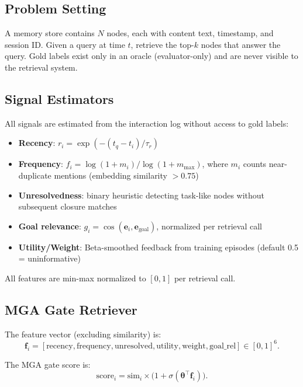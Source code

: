\documentclass[11pt,a4paper]{article}
\begin{document}
\subsection{Problem Setting}

A memory store contains $N$ nodes, each with content text, timestamp, and session ID. Given a query at time $t$, retrieve the top-$k$ nodes that answer the query. Gold labels exist only in an oracle (evaluator-only) and are never visible to the retrieval system.

\subsection{Signal Estimators}

All signals are estimated from the interaction log without access to gold labels:

\begin{itemize}[leftmargin=2em]
\item \textbf{Recency}: $r_i = \exp(-(t_q - t_i) / \tau_r)$
\item \textbf{Frequency}: $f_i = \log(1 + m_i) / \log(1 + m_{\max})$, where $m_i$ counts near-duplicate mentions (embedding similarity $> 0.75$)
\item \textbf{Unresolvedness}: binary heuristic detecting task-like nodes without subsequent closure matches
\item \textbf{Goal relevance}: $g_i = \cos(\mathbf{e}_i, \mathbf{e}_{\text{goal}})$, normalized per retrieval call
\item \textbf{Utility/Weight}: Beta-smoothed feedback from training episodes (default 0.5 = uninformative)
\end{itemize}

All features are min-max normalized to $[0,1]$ per retrieval call.

\subsection{MGA Gate Retriever}

The feature vector (excluding similarity) is:
\[
\mathbf{f}_i = [\text{recency}, \text{frequency}, \text{unresolved}, \text{utility}, \text{weight}, \text{goal\_rel}] \in [0,1]^6.
\]

The MGA gate score is:
\begin{equation}
\text{score}_i = \text{sim}_i \times \bigl(1 + \sigma(\boldsymbol{\theta}^\top \mathbf{f}_i)\bigr).
\end{equation}
\end{document}
